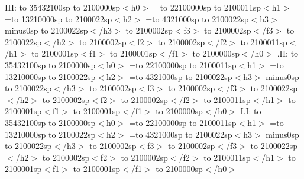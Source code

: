 \noindent
III:%
\hbox to 35432100sp{%
  \hbox to 2100000sp{$<$h0$>$}%
  =\hbox to 22100000sp{%
    \hbox to 2100011sp{$<$h1$>$}%
    =\hbox to 13210000sp{%
      \hbox to 2100022sp{$<$h2$>$}%
      =\hbox to 4321000sp{%
        \hbox to 2100022sp{$<$h3$>$}%
         minus0sp
        \hbox to 2100022sp{$<$/h3$>$}%
      }%
      \immediate
      \hbox to 2100002sp{$<$f3$>$}%
      \pdfrefxform\pdflastxform%
      \hbox to 2100002sp{$<$/f3$>$}%
      \hbox to 2100022sp{$<$/h2$>$}%
    }%
    \immediate
    \hbox to 2100002sp{$<$f2$>$}%
    \pdfrefxform\pdflastxform%
    \hbox to 2100002sp{$<$/f2$>$}%
    \hbox to 2100011sp{$<$/h1$>$}%
  }%
  \immediate
  \hbox to 2100001sp{$<$f1$>$}%
  \pdfrefxform\pdflastxform%
  \hbox to 2100001sp{$<$/f1$>$}%
  \hbox to 2100000sp{$<$/h0$>$}%
}
\vfill\eject\noindent
.II:%
\hbox to 35432100sp{%
  \hbox to 2100000sp{$<$h0$>$}%
  =\hbox to 22100000sp{%
    \hbox to 2100011sp{$<$h1$>$}%
    =\hbox to 13210000sp{%
      \hbox to 2100022sp{$<$h2$>$}%
      =\hbox to 4321000sp{%
        \hbox to 2100022sp{$<$h3$>$}%
         minus0sp
        \hbox to 2100022sp{$<$/h3$>$}%
      }%
      \immediate
      \hbox to 2100002sp{$<$f3$>$}%
      \pdfrefxform\pdflastxform%
      \hbox to 2100002sp{$<$/f3$>$}%
      \hbox to 2100022sp{$<$/h2$>$}%
    }%
    \immediate
    \hbox to 2100002sp{$<$f2$>$}%
    \pdfrefxform\pdflastxform%
    \hbox to 2100002sp{$<$/f2$>$}%
    \hbox to 2100011sp{$<$/h1$>$}%
  }%
  \hbox to 2100001sp{$<$f1$>$}%
  \pdfrefxform\pdflastxform%
  \hbox to 2100001sp{$<$/f1$>$}%
  \hbox to 2100000sp{$<$/h0$>$}%
}
\vfill\eject\noindent
I.I:%
\hbox to 35432100sp{%
  \hbox to 2100000sp{$<$h0$>$}%
  =\hbox to 22100000sp{%
    \hbox to 2100011sp{$<$h1$>$}%
    =\hbox to 13210000sp{%
      \hbox to 2100022sp{$<$h2$>$}%
      =\hbox to 4321000sp{%
        \hbox to 2100022sp{$<$h3$>$}%
         minus0sp
        \hbox to 2100022sp{$<$/h3$>$}%
      }%
      \immediate
      \hbox to 2100002sp{$<$f3$>$}%
      \pdfrefxform\pdflastxform%
      \hbox to 2100002sp{$<$/f3$>$}%
      \hbox to 2100022sp{$<$/h2$>$}%
    }%
    \hbox to 2100002sp{$<$f2$>$}%
    \pdfrefxform\pdflastxform%
    \hbox to 2100002sp{$<$/f2$>$}%
    \hbox to 2100011sp{$<$/h1$>$}%
  }%
  \immediate
  \hbox to 2100001sp{$<$f1$>$}%
  \pdfrefxform\pdflastxform%
  \hbox to 2100001sp{$<$/f1$>$}%
  \hbox to 2100000sp{$<$/h0$>$}%
}

